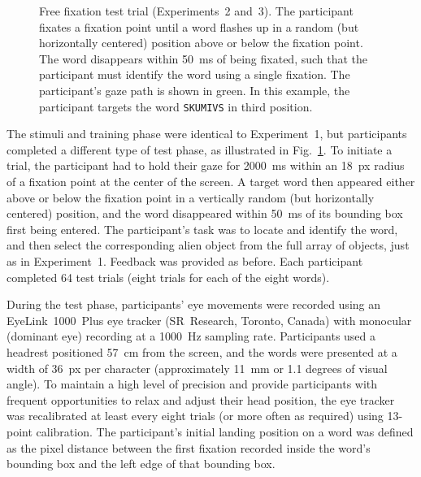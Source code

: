 \documentclass[doc,biblatex]{apa7}
\begin{document}
\begin{figure}
\vspace*{2pt}
\caption{Free fixation test trial (Experiments~2 and~3). The participant fixates a fixation point until a word flashes up in a random (but horizontally centered) position above or below the fixation point. The word disappears within 50~ms of being fixated, such that the participant must identify the word using a single fixation. The participant's gaze path is shown in green. In this example, the participant targets the word \texttt{SKUMIVS} in third position.}
\label{fig09}
\end{figure}

The stimuli and training phase were identical to Experiment~1, but participants completed a different type of test phase, as illustrated in Fig.~\ref{fig09}. To initiate a trial, the participant had to hold their gaze for 2000~ms within an 18~px radius of a fixation point at the center of the screen. A target word then appeared either above or below the fixation point in a vertically random (but horizontally centered) position, and the word disappeared within 50~ms of its bounding box first being entered. The participant's task was to locate and identify the word, and then select the corresponding alien object from the full array of objects, just as in Experiment~1. Feedback was provided as before. Each participant completed 64 test trials (eight trials for each of the eight words).

During the test phase, participants' eye movements were recorded using an EyeLink~1000~Plus eye tracker (SR~Research, Toronto, Canada) with monocular (dominant eye) recording at a 1000~Hz sampling rate. Participants used a headrest positioned 57~cm from the screen, and the words were presented at a width of 36~px per character (approximately 11~mm or 1.1 degrees of visual angle). To maintain a high level of precision and provide participants with frequent opportunities to relax and adjust their head position, the eye tracker was recalibrated at least every eight trials (or more often as required) using 13-point calibration. The participant's initial landing position on a word was defined as the pixel distance between the first fixation recorded inside the word's bounding box and the left edge of that bounding box.
\end{document}
